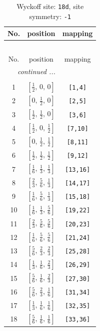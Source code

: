 \documentclass[fleqn,8pt]{jsarticle}
\begin{document}
\begin{longtable}{ccc}
\caption{Wyckoff site: {\tt 18d}, site symmetry: {\tt -1}}
 \\
 \hline \hline
No. & position & mapping \\ \hline \endfirsthead

\multicolumn{2}{l}{\tablename\ \thetable{}} \\
 \hline \hline
No. & position & mapping \\ \hline \endhead

 \hline \hline
\multicolumn{2}{r}{\footnotesize\it continued ...} \\ \endfoot

 \hline \hline
\multicolumn{2}{r}{} \\ \endlastfoot

1 & $\left[ \frac{1}{2},\, 0,\, 0 \right]$ & {\tt [1,4]} \\ \hline
2 & $\left[ 0,\, \frac{1}{2},\, 0 \right]$ & {\tt [2,5]} \\ \hline
3 & $\left[ \frac{1}{2},\, \frac{1}{2},\, 0 \right]$ & {\tt [3,6]} \\ \hline
4 & $\left[ \frac{1}{2},\, 0,\, \frac{1}{2} \right]$ & {\tt [7,10]} \\ \hline
5 & $\left[ 0,\, \frac{1}{2},\, \frac{1}{2} \right]$ & {\tt [8,11]} \\ \hline
6 & $\left[ \frac{1}{2},\, \frac{1}{2},\, \frac{1}{2} \right]$ & {\tt [9,12]} \\ \hline
7 & $\left[ \frac{1}{6},\, \frac{1}{3},\, \frac{1}{3} \right]$ & {\tt [13,16]} \\ \hline
8 & $\left[ \frac{2}{3},\, \frac{5}{6},\, \frac{1}{3} \right]$ & {\tt [14,17]} \\ \hline
9 & $\left[ \frac{1}{6},\, \frac{5}{6},\, \frac{1}{3} \right]$ & {\tt [15,18]} \\ \hline
10 & $\left[ \frac{1}{6},\, \frac{1}{3},\, \frac{5}{6} \right]$ & {\tt [19,22]} \\ \hline
11 & $\left[ \frac{2}{3},\, \frac{5}{6},\, \frac{5}{6} \right]$ & {\tt [20,23]} \\ \hline
12 & $\left[ \frac{1}{6},\, \frac{5}{6},\, \frac{5}{6} \right]$ & {\tt [21,24]} \\ \hline
13 & $\left[ \frac{5}{6},\, \frac{2}{3},\, \frac{2}{3} \right]$ & {\tt [25,28]} \\ \hline
14 & $\left[ \frac{1}{3},\, \frac{1}{6},\, \frac{2}{3} \right]$ & {\tt [26,29]} \\ \hline
15 & $\left[ \frac{5}{6},\, \frac{1}{6},\, \frac{2}{3} \right]$ & {\tt [27,30]} \\ \hline
16 & $\left[ \frac{5}{6},\, \frac{2}{3},\, \frac{1}{6} \right]$ & {\tt [31,34]} \\ \hline
17 & $\left[ \frac{1}{3},\, \frac{1}{6},\, \frac{1}{6} \right]$ & {\tt [32,35]} \\ \hline
18 & $\left[ \frac{5}{6},\, \frac{1}{6},\, \frac{1}{6} \right]$ & {\tt [33,36]} \\
\end{longtable}
\end{document}
